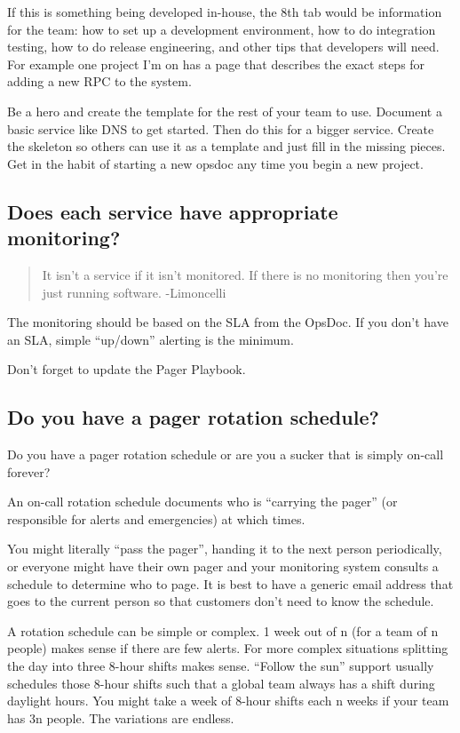 \documentclass{article}
\begin{document}
If this is something being developed in-house, the 8th tab would be information for the team: how to set up a development environment, how to do integration testing, how to do release engineering, and other tips that developers will need. For example one project I'm on has a page that describes the exact steps for adding a new RPC to the system.

Be a hero and create the template for the rest of your team to use. Document a basic service like DNS to get started. Then do this for a bigger service. Create the skeleton so others can use it as a template and just fill in the missing pieces. Get in the habit of starting a new opsdoc any time you begin a new project.

\subsection{Does each service have appropriate monitoring?}
\begin{quote}
	It isn't a service if it isn't monitored. If there is no monitoring then you're just running software. -Limoncelli
\end{quote}

The monitoring should be based on the SLA from the OpsDoc. If you don't have an SLA, simple ``up/down'' alerting is the minimum.

Don't forget to update the Pager Playbook.

\subsection{Do you have a pager rotation schedule?}
Do you have a pager rotation schedule or are you a sucker that is simply on-call forever?

An on-call rotation schedule documents who is ``carrying the pager'' (or responsible for alerts and emergencies) at which times.

You might literally ``pass the pager'', handing it to the next person periodically, or everyone might have their own pager and your monitoring system consults a schedule to determine who to page. It is best to have a generic email address that goes to the current person so that customers don't need to know the schedule.

A rotation schedule can be simple or complex. 1 week out of n (for a team of n people) makes sense if there are few alerts. For more complex situations splitting the day into three 8-hour shifts makes sense. ``Follow the sun'' support usually schedules those 8-hour shifts such that a global team always has a shift during daylight hours. You might take a week of 8-hour shifts each n weeks if your team has 3n people. The variations are endless.
\end{document}
